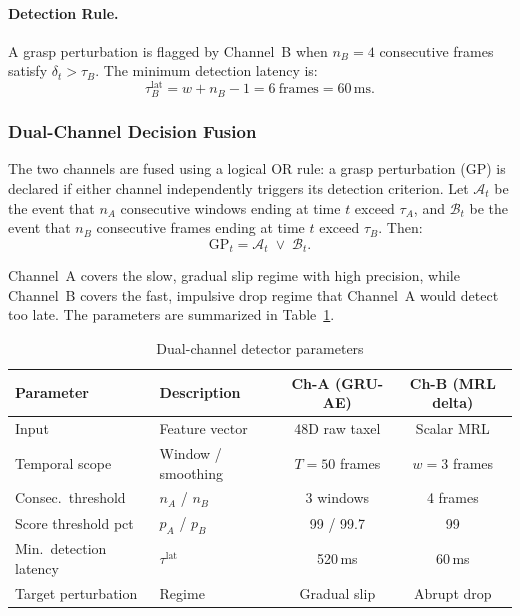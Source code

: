 \documentclass[pdflatex,sn-mathphys-num]{sn-jnl}%
\theoremstyle{thmstyleone}%
\theoremstyle{thmstyletwo}%
\theoremstyle{thmstylethree}%
\begin{document}
\paragraph{Detection Rule.}
A grasp perturbation is flagged by Channel~B when $n_B = 4$ consecutive frames satisfy $\delta_t > \tau_B$. The minimum detection latency is:
\begin{equation}
    \tau^{\mathrm{lat}}_B = w + n_B - 1 = 6\ \text{frames} = 60\,\mathrm{ms}.
    \label{eq:latency_b}
\end{equation}

\subsubsection{Dual-Channel Decision Fusion}
\label{sec:fusion}

The two channels are fused using a logical OR rule: a grasp perturbation (GP) is declared if either channel independently triggers its detection criterion. Let $\mathcal{A}_t$ be the event that $n_A$ consecutive windows ending at time $t$ exceed $\tau_A$, and $\mathcal{B}_t$ be the event that $n_B$ consecutive frames ending at time $t$ exceed $\tau_B$. Then:
\begin{equation}
    \mathrm{GP}_t = \mathcal{A}_t \;\vee\; \mathcal{B}_t.
    \label{eq:fusion}
\end{equation}

Channel~A covers the slow, gradual slip regime with high precision, while Channel~B covers the fast, impulsive drop regime that Channel~A would detect too late. The parameters are summarized in Table~\ref{tab:dual_params}.

\begin{table}[h]
\caption{Dual-channel detector parameters}
\label{tab:dual_params}
\centering
\begin{tabular}{llcc}
\hline
Parameter & Description & Ch-A (GRU-AE) & Ch-B (MRL delta) \\
\hline
Input & Feature vector & 48D raw taxel & Scalar MRL \\
Temporal scope & Window / smoothing & $T=50$ frames & $w=3$ frames \\
Consec.\ threshold & $n_A$ / $n_B$ & 3 windows & 4 frames \\
Score threshold pct & $p_A$ / $p_B$ & 99 / 99.7 & 99 \\
Min.\ detection latency & $\tau^{\mathrm{lat}}$ & 520\,ms & 60\,ms \\
Target perturbation & Regime & Gradual slip & Abrupt drop \\
\hline
\end{tabular}
\end{table}
\end{document}
